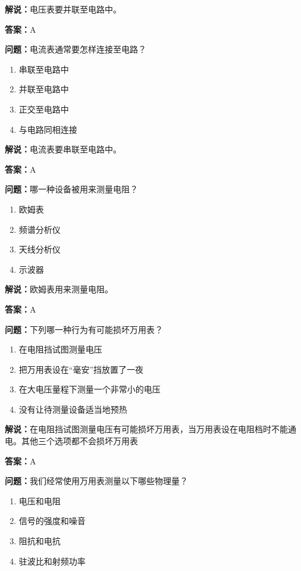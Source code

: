 \documentclass[UTF8]{ctexbook}
\begin{document}
\textbf{解说：}电压表要并联至电路中。%

\textbf{答案：}A

\textbf{问题：}电流表通常要怎样连接至电路？

\begin{enumerate}[label=\Alph*), leftmargin=3em]
  \item 串联至电路中
  \item 并联至电路中
  \item 正交至电路中
  \item 与电路同相连接
\end{enumerate}

\textbf{解说：}电流表要串联至电路中。%

\textbf{答案：}A

\textbf{问题：}哪一种设备被用来测量电阻？

\begin{enumerate}[label=\Alph*), leftmargin=3em]
  \item 欧姆表
  \item 频谱分析仪
  \item 天线分析仪
  \item 示波器
\end{enumerate}

\textbf{解说：}欧姆表用来测量电阻。

\textbf{答案：}A

\textbf{问题：}下列哪一种行为有可能损坏万用表？

\begin{enumerate}[label=\Alph*), leftmargin=3em]
  \item 在电阻挡试图测量电压
  \item 把万用表设在“毫安”挡放置了一夜
  \item 在大电压量程下测量一个非常小的电压
  \item 没有让待测量设备适当地预热
\end{enumerate}

\textbf{解说：}在电阻挡试图测量电压有可能损坏万用表，当万用表设在电阻档时不能通电。其他三个选项都不会损坏万用表%

\textbf{答案：}A

\textbf{问题：}我们经常使用万用表测量以下哪些物理量？

\begin{enumerate}[label=\Alph*), leftmargin=3em]
  \item 电压和电阻
  \item 信号的强度和噪音
  \item 阻抗和电抗
  \item 驻波比和射频功率
\end{enumerate}
\end{document}

